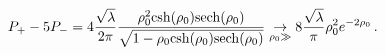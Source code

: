 \begin{equation}
P_+-5P_- = 4 \frac{\sqrt{\lambda }}{2\pi} \frac{\rho_0^2 {\rm
csh}(\rho_0){\rm sech}(\rho_0)} {\sqrt{1-\rho_0 {\rm csh}(\rho_0)
{\rm sech}(\rho_0)}} \underset{\rho_0 \gg}{\rightarrow} 8
\frac{\sqrt{\lambda }}{\pi} \rho_0^2 e^{-2\rho_0}\,.
\end{equation}

